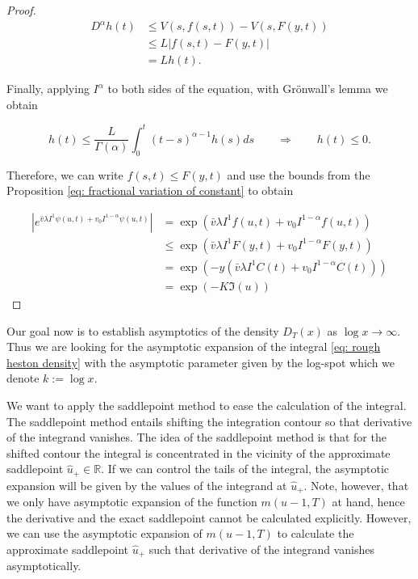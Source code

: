 \documentclass[12pt,twoside]{article}
\theoremstyle{plain}
\theoremstyle{plain}
\theoremstyle{definition}
\theoremstyle{remark}
\numberwithin{equation}{section}
\begin{document}
\begin{proof}
$$
\begin{aligned}
D^\alpha h(t) & \leq V(s, f(s,t)) - V(s, F(y,t))\\[5pt]
&\leq L|f(s,t)-F(y,t)|\\[5pt]
&=Lh(t).
\end{aligned}
$$

Finally, applying $I^\alpha$ to both sides of the equation,
with Grönwall's lemma we obtain

$$
h(t)\leq \frac{L}{\Gamma(\alpha)}\int _0^t(t-s)^{\alpha-1}h(s)ds\qquad \Rightarrow \qquad h(t) \leq 0.
$$

\vspace{5pt}

Therefore, we can write $f(s, t)\leq F(y,t)$ and use the bounds from the Proposition \ref{eq: fractional variation of constant} to obtain

$$
\begin{aligned}
\left|e^{\bar{v} \lambda I^{1} \psi(u, t)+v_{0} I^{1-\alpha} \psi(u, t)}\right|
&=\exp\left(\bar{v} \lambda I^{1} f(u, t)+v_{0} I^{1-\alpha} f(u, t)\right) \\[5pt]
&\leq \exp\left(\bar{v} \lambda I^{1} F(y, t)+v_{0} I^{1-\alpha} F(y, t)\right) \\[5pt]
&= \exp\left(-y(\bar{v} \lambda I^{1} C(t)+v_{0} I^{1-\alpha} C(t))\right) \\[5pt]
&= \exp(-K \Im(u))
\end{aligned}
$$

\end{proof}

Our goal now is to establish asymptotics of the density $D_T(x)$ as $\log x\rightarrow \infty$. Thus we are looking for the asymptotic expansion of the integral \eqref{eq: rough heston density} with the asymptotic parameter given by the log-spot which we denote $k:=\log x$.

We want to apply the saddlepoint method to ease the calculation of the integral. The saddlepoint method entails shifting the integration contour so that derivative of the integrand vanishes. The idea of the saddlepoint method is that for the shifted contour the integral is concentrated in the vicinity of the approximate saddlepoint $\hat u_+ \in \mathbb R$. If we can control the tails of the integral, the asymptotic expansion will be given by the values of the integrand at $\hat u_+$. Note, however, that we only have asymptotic expansion of the function $m(u-1, T)$ at hand, hence the derivative and the exact saddlepoint cannot be calculated explicitly. However, we can use the asymptotic expansion of $m(u-1, T)$ to calculate the approximate saddlepoint $\hat u_+$ such that derivative of the integrand vanishes asymptotically.
\end{document}
